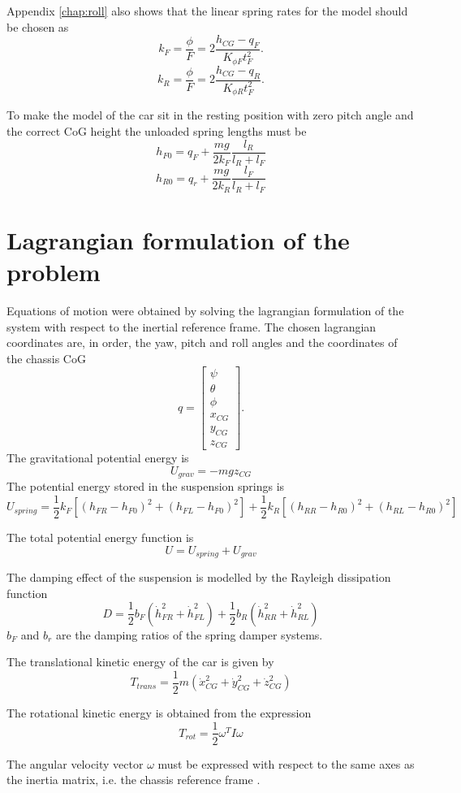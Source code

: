 Appendix \ref{chap:roll} also shows that the linear spring rates for the model should be chosen as
$$
k_F = \frac{\phi}{F} = 2\frac{h_{CG}-q_F}{K_{\phi F} t_F^2}.
$$
$$
k_R = \frac{\phi}{F} = 2\frac{h_{CG}-q_R}{K_{\phi R} t_F^2}.
$$

To make the model of the car sit in the resting position with zero pitch angle and the correct CoG height the unloaded spring lengths must be
$$ h_{F0} = q_F + \frac{mg}{2k_F}\frac{l_R}{l_R+l_F} $$
$$ h_{R0} = q_r + \frac{mg}{2k_R}\frac{l_F}{l_R+l_F} $$

\section{Lagrangian formulation of the problem}
\label{sec:6doflag}
Equations of motion were obtained by solving the lagrangian formulation of the system with respect to the inertial reference frame.
The chosen lagrangian coordinates are, in order, the yaw, pitch and roll angles and the coordinates of the chassis CoG
$$
q = \begin{bmatrix}
\psi \\
\theta \\
\phi \\
x_{CG} \\
y_{CG} \\
z_{CG}
\end{bmatrix}.
$$
The gravitational potential energy is
$$U_{grav} = -mgz_{CG}$$
The potential energy stored in the suspension springs is
$$ U_{spring} = \frac{1}{2} k_F [(h_{FR} - h_{F0})^2 + (h_{FL} - h_{F0})^2] +  \frac{1}{2} k_R [(h_{RR} - h_{R0})^2 + (h_{RL} - h_{R0})^2] $$

The total potential energy function is
$$ U = U_{spring} + U_{grav} $$

The damping effect of the suspension is modelled by the Rayleigh dissipation function
$$ D = \frac{1}{2} b_F (\dot h_{FR}^2 + \dot h_{FL}^2) + \frac{1}{2} b_R (\dot h_{RR}^2 + \dot h_{RL}^2) $$
$b_F$ and $b_r$ are the damping ratios of the spring damper systems. 

The translational kinetic energy of the car is given by
$$ T_{trans} = \frac{1}{2} m (\dot x_{CG}^2 +\dot y_{CG}^2 +\dot z_{CG}^2 ) $$

The rotational kinetic energy is obtained from the expression
$$ T_{rot} = \frac{1}{2}\omega^T I \omega $$

The angular velocity vector $\omega$ must be expressed with respect to the same axes as the inertia matrix, i.e. the chassis reference frame .

